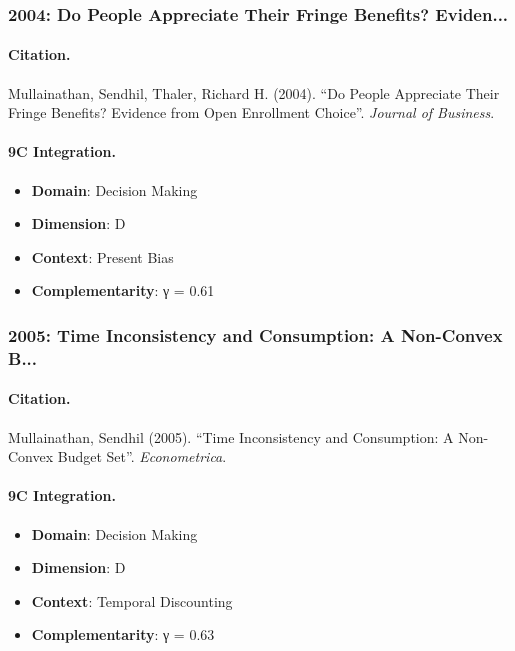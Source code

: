 \subsubsection{2004: Do People Appreciate Their Fringe Benefits? Eviden...}

\paragraph{Citation.}
Mullainathan, Sendhil, Thaler, Richard H. (2004). ``Do People Appreciate Their Fringe Benefits? Evidence from Open Enrollment Choice''. \textit{Journal of Business}.

\paragraph{9C Integration.}
\begin{itemize}[nosep]
  \item \textbf{Domain}: Decision Making
  \item \textbf{Dimension}: D
  \item \textbf{Context}: Present Bias
  \item \textbf{Complementarity}: γ = 0.61
\end{itemize}


\subsubsection{2005: Time Inconsistency and Consumption: A Non-Convex B...}

\paragraph{Citation.}
Mullainathan, Sendhil (2005). ``Time Inconsistency and Consumption: A Non-Convex Budget Set''. \textit{Econometrica}.

\paragraph{9C Integration.}
\begin{itemize}[nosep]
  \item \textbf{Domain}: Decision Making
  \item \textbf{Dimension}: D
  \item \textbf{Context}: Temporal Discounting
  \item \textbf{Complementarity}: γ = 0.63
\end{itemize}



